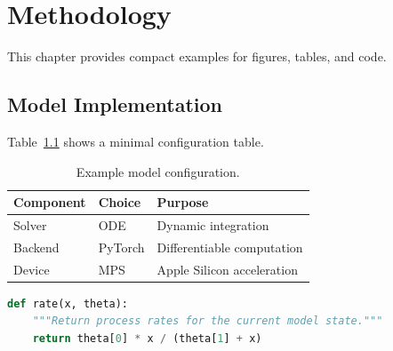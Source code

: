 \chapter{Methodology}
\label{chap:methodology}

This chapter provides compact examples for figures, tables, and code.

\section{Model Implementation}

Table~\ref{tab:methodology:configuration} shows a minimal configuration table.

\begin{table}[tb]
  \centering
  \caption{Example model configuration.}
  \label{tab:methodology:configuration}
  \begin{tabular}{lll}
    \toprule
    Component & Choice & Purpose \\
    \midrule
    Solver & ODE & Dynamic integration \\
    Backend & PyTorch & Differentiable computation \\
    Device & MPS & Apple Silicon acceleration \\
    \bottomrule
  \end{tabular}
\end{table}

\begin{lstlisting}[language=Python,caption={Minimal model-rate function.},label={lst:methodology:rate}]
def rate(x, theta):
    """Return process rates for the current model state."""
    return theta[0] * x / (theta[1] + x)
\end{lstlisting}

